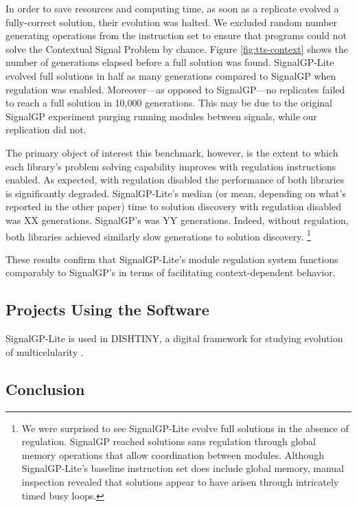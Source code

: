 In order to save resources and computing time, as soon as a replicate evolved a fully-correct solution, their evolution was halted.
We excluded random number generating operations from the instruction set to ensure that programs could not solve the Contextual Signal Problem by chance.
Figure \ref{fig:tts-context} shows the number of generations elapsed before a full solution was found.
SignalGP-Lite evolved full solutions in half as many generations compared to SignalGP when regulation was enabled.
Moreover---as opposed to SignalGP---no replicates failed to reach a full solution in 10,000 generations.
This may be due to the original SignalGP experiment purging running modules between signals, while our replication did not.

The primary object of interest this benchmark, however, is the extent to which each library's problem solving capability improves with regulation instructions enabled.
As expected, with regulation disabled the performance of both libraries is significantly degraded.
SignalGP-Lite's median (or mean, depending on what's reported in the other paper) time to solution discovery with regulation disabled was XX generations.
SignalGP's was YY generations.
Indeed, without regulation, both libraries achieved similarly slow generations to solution discovery.
\footnote{
We were surprised to see SignalGP-Lite evolve full solutions in the absence of regulation.
SignalGP reached solutions sans regulation through global memory operations that allow coordination between modules.
Although SignalGP-Lite's baseline instruction set does include global memory, manual inspection revealed that solutions appear to have arisen through intricately timed busy loops.
}

These results confirm that SignalGP-Lite's module regulation system functions comparably to SignalGP's in terms of facilitating context-dependent behavior.

\subsection{Projects Using the Software}

SignalGP-Lite is used in DISHTINY, a digital framework for studying evolution of multicelularity \citep{moreno2019toward,moreno2021exploring,moreno2021case}.

\subsection{Conclusion}

